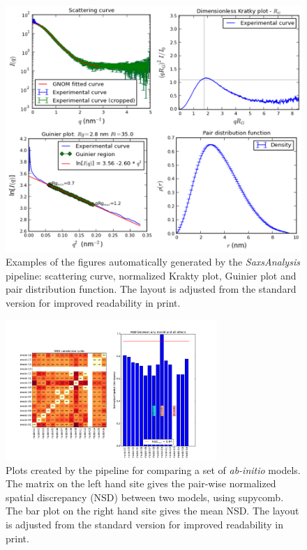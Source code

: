 \documentclass[preprint,pdf]{iucr}              %
\begin{document}
\begin{figure}
\centering
\includegraphics[width=18cm]{autoplot.png}
\caption{Examples of the figures automatically generated by the
\textit{SaxsAnalysis} pipeline: scattering curve, normalized Krakty plot, Guinier plot and pair distribution function.
The layout is adjusted from the standard version for improved readability in
print.}
\label{plots}
\end{figure}

\begin{figure}
\centering
\includegraphics[width=8cm]{nsd.png}
\caption{Plots created by the pipeline for comparing a set of \textit{ab-initio} models.
The matrix on the left hand site gives the pair-wise normalized spatial discrepancy (NSD) between two models, using supycomb.
The bar plot on the right hand site gives the mean NSD.
The layout is adjusted from the standard version for improved readability in
print.}
\label{fgr:nsd}
\end{figure}
\end{document}
